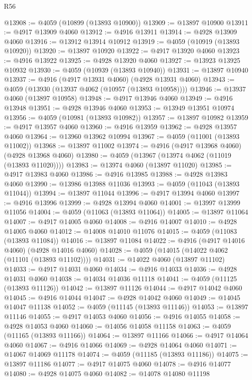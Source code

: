 \begin{lexlean}{R56}
\begin{coremodule}
@13908 := @4059 (@10899 (@13893 @10900))
@13909 := @13897 @10900
@13911 := @4917 @13909 @4060
@13912 := @4916 @13911
@13914 := @4928 @13909 @4060
@13916 := @13912 @13914 @10912
@13919 := @4059 (@10919 (@13893 @10920))
@13920 := @13897 @10920
@13922 := @4917 @13920 @4060
@13923 := @4916 @13922
@13925 := @4928 @13920 @4060
@13927 := @13923 @13925 @10932
@13930 := @4059 (@10939 (@13893 @10940))
@13931 := @13897 @10940
@13937 := @4916 (@4917 @13931 @4060) (@4928 @13931 @4060)
@13943 := @4059 (@13930 (@13937 @4062 (@10957 (@13893 @10958))))
@13946 := @13937 @4060 (@13897 @10958)
@13948 := @4917 @13946 @4060
@13949 := @4916 @13948
@13951 := @4928 @13946 @4060
@13953 := @13949 @13951 @10974
@13956 := @4059 (@10981 (@13893 @10982))
@13957 := @13897 @10982
@13959 := @4917 @13957 @4060
@13960 := @4916 @13959
@13962 := @4928 @13957 @4060
@13964 := @13960 @13962 @10994
@13967 := @4059 (@11001 (@13893 @11002))
@13968 := @13897 @11002
@13974 := @4916 (@4917 @13968 @4060) (@4928 @13968 @4060)
@13980 := @4059 (@13967 (@13974 @4062 (@11019 (@13893 @11020))))
@13983 := @13974 @4060 (@13897 @11020)
@13985 := @4917 @13983 @4060
@13986 := @4916 @13985
@13988 := @4928 @13983 @4060
@13990 := @13986 @13988 @11036
@13993 := @4059 (@11043 (@13893 @11044))
@13994 := @13897 @11044
@13996 := @4917 @13994 @4060
@13997 := @4916 @13996
@13999 := @4928 @13994 @4060
@14001 := @13997 @13999 @11056
@14004 := @4059 (@11063 (@13893 @11064))
@14005 := @13897 @11064
@14007 := @4917 @14005 @4060
@14008 := @4916 @14007
@14010 := @4928 @14005 @4060
@14012 := @14008 @14010 @11076
@14015 := @4059 (@11083 (@13893 @11084))
@14016 := @13897 @11084
@14022 := @4916 (@4917 @14016 @4060) (@4928 @14016 @4060)
@14028 := @4059 (@14015 (@14022 @4062 (@11101 (@13893 @11102))))
@14031 := @14022 @4060 (@13897 @11102)
@14033 := @4917 @14031 @4060
@14034 := @4916 @14033
@14036 := @4928 @14031 @4060
@14038 := @14034 @14036 @11118
@14041 := @4059 (@11125 (@13893 @11126))
@14042 := @13897 @11126
@14044 := @4917 @14042 @4060
@14045 := @4916 @14044
@14047 := @4928 @14042 @4060
@14049 := @14045 @14047 @11138
@14052 := @4059 (@11145 (@13893 @11146))
@14053 := @13897 @11146
@14055 := @4917 @14053 @4060
@14056 := @4916 @14055
@14058 := @4928 @14053 @4060
@14060 := @14056 @14058 @11158
@14063 := @4059 (@11165 (@13893 @11166))
@14064 := @13897 @11166
@14066 := @4917 @14064 @4060
@14067 := @4916 @14066
@14069 := @4928 @14064 @4060
@14071 := @14067 @14069 @11178
@14074 := @4059 (@11185 (@13893 @11186))
@14075 := @13897 @11186
@14077 := @4917 @14075 @4060
@14078 := @4916 @14077
@14080 := @4928 @14075 @4060
@14082 := @14078 @14080 @11198

\end{coremodule}
\end{lexlean}
